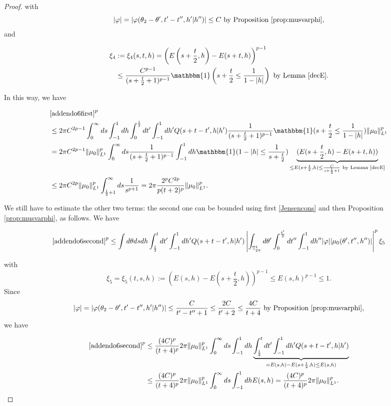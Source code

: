 \documentclass[a4paper,10pt,reqno]{amsart}
\numberwithin{equation}{subsection}
\numberwithin{figure}{subsection}
\begin{document}
\begin{proof}
with
\[
|\varphi|=|\varphi(\theta_2-\theta',t'-t'',h'|h'')|\leq C\textrm{ by Proposition \ref{prop:musvarphi}},
\]
and 

\begin{align*}
\xi_4&:=\xi_4(s,t,h)=\left(E\left(s+\frac{t}{2},h\right)-E(s+t,h)\right)^{p-1}
\\
&\leq\frac{C^{p-1}}{(s+\frac{t}{2}+1)^{p-1}}\mathbbm{1}\left(s+\frac{t}{2}\leq\frac{1}{1-|h|}\right)\textrm{ by Lemma \ref{decE}}.
\end{align*}

In this way, we have

{\tiny\begin{align*}
&\eqref{addendo6first}^p
\\
&\leq2\pi C^{2p-1}\int_0^{\infty}ds\int_{-1}^1dh\int_0^{\frac{t}{2}}dt'\int_{-1}^1dh'Q(s+t-t',h|h')\frac{1}{(s+\frac{t}{2}+1)^{p-1}}\mathbbm{1}(s+\frac{t}{2}\leq\frac{1}{1-|h|})\|\mu_0\|_{L^1}^p
\\
&=2\pi C^{2p-1}\|\mu_0\|_{L^1}^p\int_0^{\infty}ds\frac{1}{(s+\frac{t}{2}+1)^{p-1}}\int_{-1}^1dh\mathbbm{1}(1-|h|\leq\frac{1}{s+\frac{t}{2}})\underbrace{(E(s+\frac{t}{2},h)-E(s+t,h))}_{\leq E(s+\frac{t}{2},h)\leq\frac{C}{s+\frac{t}{2}+1}\textrm{ by Lemma \ref{decE}}}
\\
&\leq2\pi C^{2p}\|\mu_0\|_{L^1}^p\int_{\frac{t}{2}+1}^{\infty}ds\frac{1}{s^{p+1}}=2\pi \frac{2^pC^{2p}}{p(t+2)^p}\|\mu_0\|_{L^1}^p.
\end{align*}}

We still have to estimate the other two terms: the second one can be bounded using first \eqref{Jensencons} and then Proposition \ref{prop:musvarphi}, as follows. We have

{\scriptsize\begin{align*}
\eqref{addendo6second}^p\leq\int d\theta dsdh\int_{\frac{t}{2}}^tdt'\int_{-1}^1dh'Q(s+t-t',h|h')\left|\int_{\mathbb{T}^1_{2\pi}}d\theta'\int_0^{\frac{t'}{2}}dt''\int_{-1}^1dh''|\varphi||\mu_0(\theta',t'',h'')|\right|^p\xi_5
\end{align*}}

with
\[
\xi_5=\xi_5(t,s,h):=\left(E(s,h)-E\left(s+\frac{t}{2},h\right)\right)^{p-1}\leq E(s,h)^{p-1}\leq1.
\]
Since
\[
|\varphi|=|\varphi(\theta_2-\theta',t'-t'',h'|h'')|\leq \frac{C}{t'-t''+1}\leq\frac{2C}{t'+2}\leq\frac{4C}{t+4}\textrm{ by Proposition \ref{prop:musvarphi}},
\]
we have

\begin{align*}
\eqref{addendo6second}^p&\leq\frac{(4C)^p}{(t+4)^p}2\pi\|\mu_0\|_{L^1}^p\int_0^{\infty}ds\int_{-1}^1dh\underbrace{\int_{\frac{t}{2}}^tdt'\int_{-1}^1dh'Q(s+t-t',h|h')}_{=E(s,h)-E(s+\frac{t}{2},h)\leq E(s,h)}
\\
&\leq\frac{(4C)^p}{(t+4)^p}2\pi\|\mu_0\|_{L^1}^p\int_0^{\infty}ds\int_{-1}^1dhE(s,h)=\frac{(4C)^p}{(t+4)^p}2\pi\|\mu_0\|_{L^1}^p.
\end{align*}


\end{proof}
\end{document}
